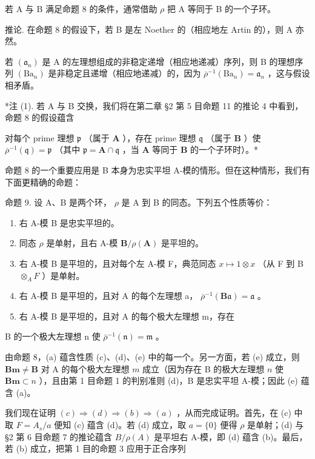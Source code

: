 若 A 与 B 满足命题 8 的条件，通常借助 \(\rho\) 把 A 等同于 B 的一个子环。

推论. 在命题 8 的假设下，若 B 是左 Noether 的（相应地左 Artin 的），则 A 亦然。

若 \((\mathfrak{a}_n)\) 是 A 的左理想组成的非稳定递增（相应地递减）序列，则 B 的理想序列 \((\mathrm{Ba}_n)\) 是非稳定且递增（相应地递减）的，因为 \(\overline{\rho}^{-1}(\mathrm{Ba}_n) = \mathfrak{a}_n\) ，这与假设相矛盾。

*注 (1). 若 A 与 B 交换，我们将在第二章 §2 第 5 目命题 11 的推论 4 中看到，命题 8 的假设蕴含

对每个 \(\text{prime}\) 理想 \(\mathfrak{p}\) （属于 \(\mathbf{A}\) ），存在 \(\text{prime}\) 理想 \(\mathfrak{q}\) （属于 \(\mathbf{B}\) ）使 \(\overline{\rho}^{-1}(\mathfrak{q}) = \mathfrak{p}\) （其中 \(\mathfrak{p} = \mathbf{A} \cap \mathfrak{q}\) ，当 \(\mathbf{A}\) 等同于 \(\mathbf{B}\) 的一个子环时）。*

命题 8 的一个重要应用是 B 本身为忠实平坦 A-模的情形。但在这种情形，我们有下面更精确的命题：

命题 9. 设 A、B 是两个环， \(\rho\) 是 A 到 B 的同态。下列五个性质等价：

\begin{enumerate}
\def\labelenumi{(\alph{enumi})}
\item
  右 A-模 B 是忠实平坦的。
\item
  同态 \(\rho\) 是单射，且右 A-模 \(\mathbf{B} / \rho (\mathbf{A})\) 是平坦的。
\item
  右 A-模 B 是平坦的，且对每个左 A-模 F，典范同态 \(x \mapsto 1 \otimes x\) （从 F 到 B \(\otimes_{A} F\) ）是单射。
\item
  右 A-模 B 是平坦的，且对 A 的每个左理想 a， \(\overline{\rho}^{-1}(\mathbf{B}\mathfrak{a}) = \mathfrak{a}\) 。
\item
  右 A-模 B 是平坦的，且对 A 的每个极大左理想 m，存在
\end{enumerate}

B 的一个极大左理想 n 使 \(\bar{\rho}^{-1}(\mathfrak{n}) = \mathfrak{m}\) 。

由命题 8，(a) 蕴含性质 (c)、(d)、(e) 中的每一个。另一方面，若 (e) 成立，则 \(\mathbf{Bm} \neq \mathbf{B}\) 对 A 的每个极大左理想 \(m\) 成立（因为存在 B 的极大左理想 \(n\) 使 \(\mathbf{Bm} \subset n\) ），且由第 1 目命题 1 的判别准则 (d)，B 是忠实平坦 A-模；因此 (e) 蕴含 (a)。

我们现在证明 \((c) \Rightarrow (d) \Rightarrow (b) \Rightarrow (a)\) ，从而完成证明。首先，在 (c) 中取 \(F = A_{s}/a\) 便知 (c) 蕴含 (d)。若 (d) 成立，取 \(a = \{0\}\) 便得 \(\rho\) 是单射；(d) 与 §2 第 6 目命题 7 的推论蕴含 \(B/\rho(A)\) 是平坦右 A-模，即 (d) 蕴含 (b)。最后，若 (b) 成立，把第 1 目的命题 3 应用于正合序列

